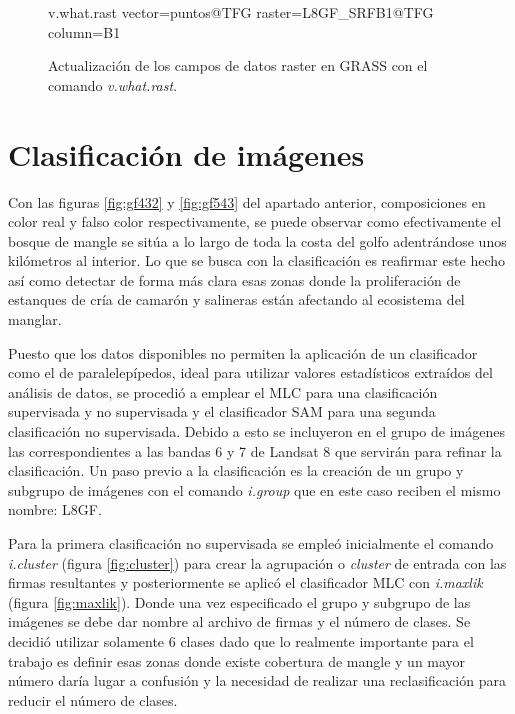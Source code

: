 \begin{figure}[ht]
\centering
\begin{boxedverbatim}
	v.what.rast vector=puntos@TFG raster=L8GF_SRFB1@TFG column=B1
\end{boxedverbatim}
\caption[Actualización de los datos raster]{Actualización de los campos de datos raster en GRASS con el comando \textit{v.what.rast}.}
\label{fig:v.what.rast}
\end{figure}

\section{Clasificación de imágenes}
Con las figuras \ref{fig:gf432} y \ref{fig:gf543} del apartado anterior, composiciones en color real y falso color respectivamente, se puede observar como efectivamente el bosque de mangle se sitúa a lo largo de toda la costa del golfo adentrándose unos kilómetros al interior. Lo que se busca con la clasificación es reafirmar este hecho así como detectar de forma más clara esas zonas donde la proliferación de estanques de cría de camarón y salineras están afectando al ecosistema del manglar.%

Puesto que los datos disponibles no permiten la aplicación de un clasificador como el de paralelepípedos, ideal para utilizar valores estadísticos extraídos del análisis de datos, se procedió a emplear el \ac{MLC} para una clasificación supervisada y no supervisada y el clasificador \ac{SAM} para una segunda clasificación no supervisada. Debido a esto se incluyeron en el grupo de imágenes las correspondientes a las bandas 6 y 7 de Landsat 8 que servirán para refinar la clasificación. Un paso previo a la clasificación es la creación de un grupo y subgrupo de imágenes con el comando \textit{i.group} que en este caso reciben el mismo nombre: L8GF.%

Para la primera clasificación no supervisada se empleó inicialmente el comando \textit{i.cluster} (figura \ref{fig:cluster}) para crear la agrupación o \textit{cluster} de entrada con las firmas resultantes y posteriormente se aplicó el clasificador \ac{MLC} con \textit{i.maxlik} (figura \ref{fig:maxlik}). Donde una vez especificado el grupo y subgrupo de las imágenes se debe dar nombre al archivo de firmas y el número de clases. Se decidió utilizar solamente 6 clases dado que lo realmente importante para el trabajo es definir esas zonas donde existe cobertura de mangle y un mayor número daría lugar a confusión y la necesidad de realizar una reclasificación para reducir el número de clases.%

